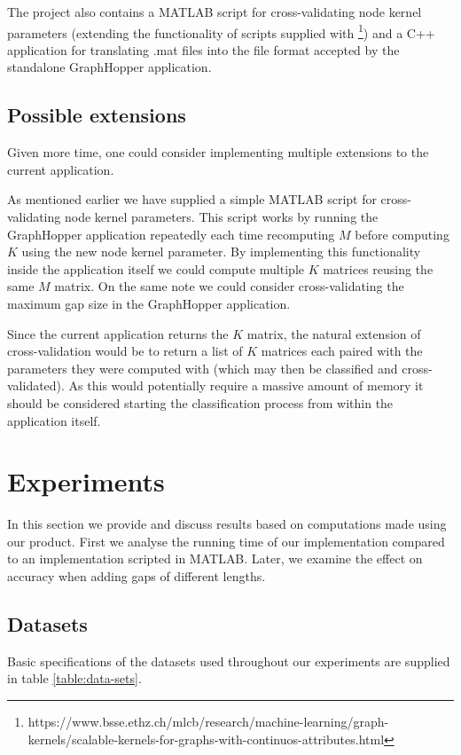 \documentclass{article}
\begin{document}
The project also contains a MATLAB script for cross-validating node kernel parameters (extending the functionality of scripts supplied with \cite{graphhopper}\footnote{https://www.bsse.ethz.ch/mlcb/research/machine-learning/graph-kernels/scalable-kernels-for-graphs-with-continuos-attributes.html}) and a C++ application for translating .mat files into the file format accepted by the standalone GraphHopper application.

\subsection{Possible extensions}
Given more time, one could consider implementing multiple extensions to the current application.

As mentioned earlier we have supplied a simple MATLAB script for cross-validating node kernel parameters. This script works by running the GraphHopper application repeatedly each time recomputing $M$ before computing $K$ using the new node kernel parameter. By implementing this functionality inside the application itself we could compute multiple $K$ matrices reusing the same $M$ matrix. On the same note we could consider cross-validating the maximum gap size in the GraphHopper application.

Since the current application returns the $K$ matrix, the natural extension of cross-validation would be to return a list of $K$ matrices each paired with the parameters they were computed with (which may then be classified and cross-validated). As this would potentially require a massive amount of memory it should be considered starting the classification process from within the application itself.

\section{Experiments}
In this section we provide and discuss results based on computations made using our product. First we analyse the running time of our implementation compared to an implementation scripted in MATLAB. Later, we examine the effect on accuracy when adding gaps of different lengths.

\subsection{Datasets}
Basic specifications of the datasets used throughout our experiments are supplied in table \ref{table:data-sets}.
\end{document}
